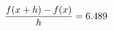 \documentclass[preview]{standalone}
\begin{document}
\begin{align*}
\special{dvisvgm:raw <g id='unique000'>}\frac{f(x+h)-f(x)}{h} = 6.489\special{dvisvgm:raw </g>}
\end{align*}
\end{document}
